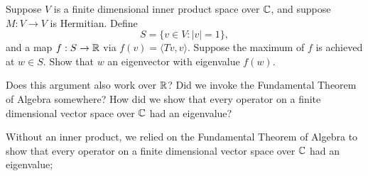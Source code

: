 \documentclass{homework}
\begin{document}
\begin{problem}
  Suppose $V$ is a finite dimensional inner product space over $\mathbb{C}$,
  and suppose $M : V \to V$ is Hermitian.  Define
  \[
    S = \{ v \in V : |v| = 1 \},
  \]
  and a map $f : S \to \mathbb{R}$ via $f(v) = \langle Tv, v \rangle$.
  Suppose the maximum of $f$ is achieved at $w \in S$.  Show that $w$
  an eigenvector with eigenvalue $f(w)$.

  Does this argument also work over $\mathbb{R}$?  Did we invoke the
  Fundamental Theorem of Algebra somewhere?  How did we show that
  every operator on a finite dimensional vector space over $\mathbb{C}$ had an
  eigenvalue?
  
  Without an inner product,
  we relied on the Fundamental Theorem of Algebra to show that every operator on a finite dimensional vector space over $\mathbb{C}$ had an eigenvalue; 
\end{problem}
\end{document}
